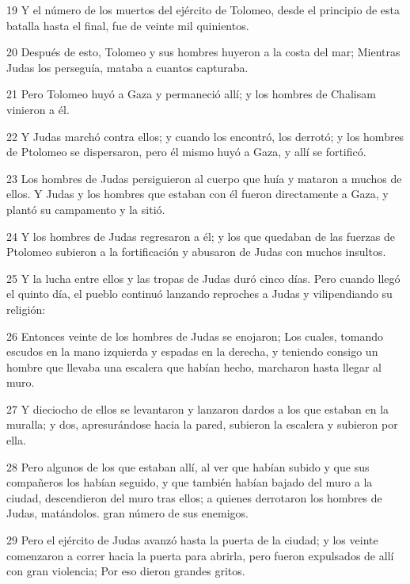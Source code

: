 \par 19 Y el número de los muertos del ejército de Tolomeo, desde el principio de esta batalla hasta el final, fue de veinte mil quinientos.

\par 20 Después de esto, Tolomeo y sus hombres huyeron a la costa del mar; Mientras Judas los perseguía, mataba a cuantos capturaba.

\par 21 Pero Tolomeo huyó a Gaza y permaneció allí; y los hombres de Chalisam vinieron a él.

\par 22 Y Judas marchó contra ellos; y cuando los encontró, los derrotó; y los hombres de Ptolomeo se dispersaron, pero él mismo huyó a Gaza, y allí se fortificó.

\par 23 Los hombres de Judas persiguieron al cuerpo que huía y mataron a muchos de ellos. Y Judas y los hombres que estaban con él fueron directamente a Gaza, y plantó su campamento y la sitió.

\par 24 Y los hombres de Judas regresaron a él; y los que quedaban de las fuerzas de Ptolomeo subieron a la fortificación y abusaron de Judas con muchos insultos.

\par 25 Y la lucha entre ellos y las tropas de Judas duró cinco días. Pero cuando llegó el quinto día, el pueblo continuó lanzando reproches a Judas y vilipendiando su religión:

\par 26 Entonces veinte de los hombres de Judas se enojaron; Los cuales, tomando escudos en la mano izquierda y espadas en la derecha, y teniendo consigo un hombre que llevaba una escalera que habían hecho, marcharon hasta llegar al muro.

\par 27 Y dieciocho de ellos se levantaron y lanzaron dardos a los que estaban en la muralla; y dos, apresurándose hacia la pared, subieron la escalera y subieron por ella.

\par 28 Pero algunos de los que estaban allí, al ver que habían subido y que sus compañeros los habían seguido, y que también habían bajado del muro a la ciudad, descendieron del muro tras ellos; a quienes derrotaron los hombres de Judas, matándolos. gran número de sus enemigos.

\par 29 Pero el ejército de Judas avanzó hasta la puerta de la ciudad; y los veinte comenzaron a correr hacia la puerta para abrirla, pero fueron expulsados ​​de allí con gran violencia; Por eso dieron grandes gritos.

